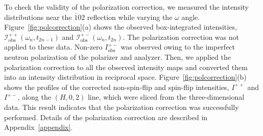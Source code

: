 \documentclass[%
 reprint,
superscriptaddress,
 amsmath,amssymb,
 aps,
floatfix,
]{revtex4-2}
\begin{document}
To check the validity of the polarization correction, we measured the intensity distributions near the $\bar{1}02$ reflection while varying the $\omega$ angle.
Figure~\ref{fig:polcorrection}(a) shows the observed box-integrated intensities, $\mathcal{I}^{++}_\mathrm{obs}(\omega_n, t_{2n-1})$ and $\mathcal{I}^{+-}_\mathrm{obs}(\omega_n, t_{2n})$.
The polarization correction was not applied to these data.
Non-zero $I^{+-}_\mathrm{obs}$ was observed owing to the imperfect neutron polarization of the polarizer and analyzer. %
Then, we applied the polarization correction to all the observed intensity maps and converted them into an intensity distribution in reciprocal space.
Figure~\ref{fig:polcorrection}(b) shows the profiles of the corrected non-spin-flip and spin-flip intensities, ${I}^{++}$ and ${I}^{+-}$, along the $(H,0,2)$ line, which were sliced from the three-dimensional data.
This result indicates that the polarization correction was successfully performed.
Details of the polarization correction are described in Appendix~\ref{appendix}.

\end{document}
